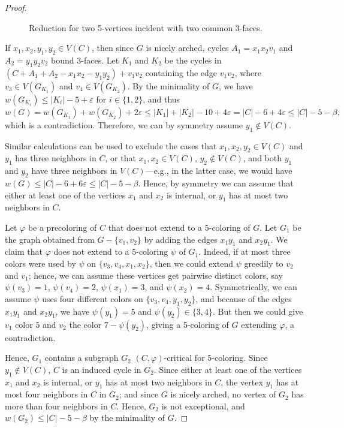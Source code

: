 \documentclass[12pt,twoside,openright,a4paper]{book}
\begin{document}
\begin{proof}
\begin{figure}
\caption{Reduction for two 5-vertices incident with two common 3-faces.}\label{fig:wt5-nofour55}
\end{figure}

If $x_1,x_2,y_1,y_2\in V(C)$, then since $G$ is nicely arched, cycles $A_1=x_1x_2v_1$ and $A_2=y_1y_2v_2$
bound 3-faces.  Let $K_1$ and $K_2$ be the cycles in $(C+A_1+A_2-x_1x_2-y_1y_2)+v_1v_2$ containing
the edge $v_1v_2$, where $v_3\in V(G_{K_1})$ and $v_4\in V(G_{K_2})$.  By the minimality of $G$, we
have $w(G_{K_i})\le |K_i|-5+\varepsilon$ for $i\in\{1,2\}$, and thus
$$w(G)=w(G_{K_1})+w(G_{K_2})+2\varepsilon\le |K_1|+|K_2|-10+4\varepsilon=|C|-6+4\varepsilon\le |C|-5-\beta,$$
which is a contradiction.  Therefore, we can by symmetry assume $y_1\not\in V(C)$.

Similar calculations can be used to exclude the cases that
$x_1,x_2,y_2\in V(C)$ and $y_1$ has three neighbors in $C$, or that $x_1,x_2\in V(C)$, $y_2\not\in V(C)$, and both
$y_1$ and $y_2$ have three neighbors in $V(C)$---e.g., in the latter case, we would have
$w(G)\le |C|-6+6\varepsilon\le |C|-5-\beta$.  Hence, by symmetry we can assume that either at least one of the
vertices $x_1$ and $x_2$ is internal, or $y_1$ has at most two neighbors in $C$.

Let $\varphi$ be a precoloring of $C$ that does not extend to a $5$-coloring of $G$.
Let $G_1$ be the graph obtained from $G-\{v_1,v_2\}$ by adding the edges $x_1y_1$ and $x_2y_1$.
We claim that $\varphi$ does not extend to a $5$-coloring $\psi$ of $G_1$.  Indeed, if at most
three colors were used by $\psi$ on $\{v_3,v_4,x_1,x_2\}$, then we could extend $\psi$ greedily to $v_2$
and $v_1$; hence, we can assume these vertices get pairwise distinct colors, say
$\psi(v_3)=1$, $\psi(v_4)=2$, $\psi(x_1)=3$, and $\psi(x_2)=4$.  Symmetrically, we can assume
$\psi$ uses four different colors on $\{v_3,v_4,y_1,y_2\}$, and because of the edges $x_1y_1$ and $x_2y_1$,
we have $\psi(y_1)=5$ and $\psi(y_2)\in\{3,4\}$.  But then we could give $v_1$ color $5$ and $v_2$ the color $7-\psi(y_2)$,
giving a 5-coloring of $G$ extending $\varphi$, a contradiction.

Hence, $G_1$ contains a subgraph $G_2$ $(C,\varphi)$-critical for $5$-coloring.
Since $y_1\not\in V(C)$, $C$ is an induced cycle in $G_2$.  Since either at least one of the vertices
$x_1$ and $x_2$ is internal, or $y_1$ has at most two neighbors in $C$, the vertex $y_1$ has
at most four neighbors in $C$ in $G_2$; and since $G$ is nicely arched, no vertex of $G_2$ has more than four neighbors in $C$.
Hence, $G_2$ is not exceptional, and $w(G_2)\le |C|-5-\beta$ by the minimality of $G$.


\end{proof}
\end{document}
